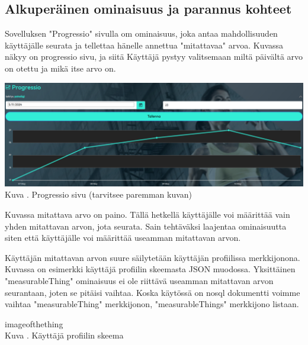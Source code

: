 

\subsection{Alkuperäinen ominaisuus ja parannus kohteet}





Sovelluksen  "Progressio"{} sivulla om ominaisuus, 
joka antaa mahdollisuuden käyttäjälle seurata ja tellettaa hänelle annettua "mitattavaa"{} arvoa.
Kuvassa \nextImageCount {} näkyy on progressio sivu, 
ja siitä Käyttäjä pystyy valitsemaan miltä päivältä arvo on otettu ja mikä itse arvo on.
\medskip

\bigskip
\includegraphics[width =15cm]{src/public/progressiosingle.png}\\
Kuva \getImgCount {}. Progressio sivu (tarvitsee paremman kuvan)
\medskip



Kuvassa \theimgCounter {} mitattava arvo on paino. 
% 
Tällä hetkellä käyttäjälle voi määrittää vain yhden mitattavan arvon, jota seurata.
Sain tehtäväksi laajentaa ominaisuutta siten että käyttäjälle voi määrittää useamman mitattavan arvon.
\medskip


Käyttäjän mitattavan arvon suure säilytetään käyttäjän profiilissa merkkijonona. 
Kuvassa \nextImageCount {} on esimerkki käyttäjä profiilin skeemasta JSON muodossa.
Yksittäinen "measurableThing"{} ominaisuus ei ole riittävä useamman mitattavan arvon seurantaan, joten se pitäisi vaihtaa.
Koska käytössä on nosql dokumentti voimme vaihtaa "measurableThing"{} merkkijonon, "measurableThings"{} merkkijono listaan.
\medskip


\bigskip
imageofthething\\
Kuva \getImgCount {}. Käyttäjä profiilin skeema
\medskip













